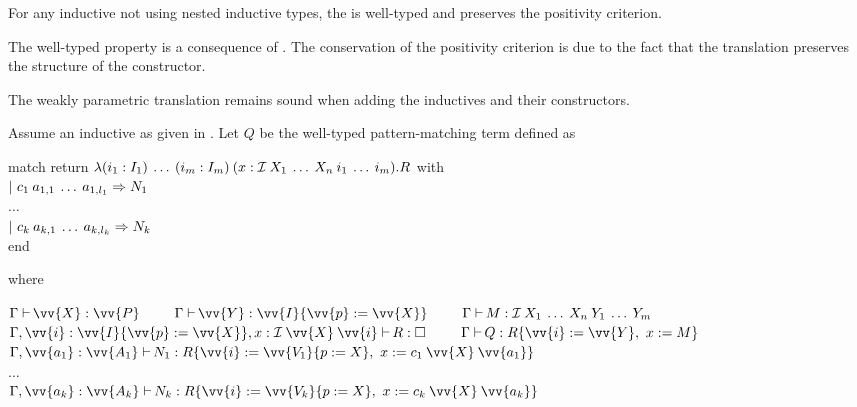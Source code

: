 \begin{Theorem}
For any inductive \IndD{} not using nested inductive types, the  is well-typed 
and preserves the positivity criterion.
\end{Theorem}

\begin{Proof}
The well-typed property is a consequence of . The conservation of the
positivity criterion is due to the fact that the translation preserves the structure of the constructor.
\end{Proof}

\begin{Corollary}
The weakly parametric translation remains sound when adding the inductives and their constructors.
\end{Corollary}

\newcommand{\MatchTerm}{\ensuremath{Q}}
\begin{Definition}
\label{def:PM}
Assume an inductive \IndD{} as given in . Let \MatchTerm{} be the well-typed 
pattern-matching term defined as
\begin{adjustwidth}{1.5em}{0cm} \normalfont \sffamily
match \M{} return $\lambda \app{(\typing{i_1}{I_1})}{\dots}{(\typing{i_m}{I_m})}{
                    (x:\app{\IndD}{X_1}{\dots}{X_n}{i_1}{\dots}{i_m})}.R$ with\\
$|\ \app{c_1}{a_{1,1}}{\dots}{a_{1,l_1}} \Rightarrow N_1$\\
$\dots$\\
$|\ \app{c_k}{a_{k,1}}{\dots}{a_{k,l_k}} \Rightarrow N_k$\\
end
\end{adjustwidth}
where
\begin{center}
{
\def\intercolumn{2.5em}
\def\interline{5pt}
$
\ctyping{\vv{X}}{\vv{P}}
\hspace{\intercolumn}
\ctyping{\vv{Y}}{\subst{\vv{I}}{\vv{p}}{\vv{X}}}
\hspace{\intercolumn}
\ctyping{M}{\app{\IndD}{X_1}{\dots}{X_n}{Y_1}{\dots}{Y_m}}
$
\vspace{\interline{}}\\
$
\ctyping[\vv{i}:\subst{\vv{I}}{\vv{p}}{\vv{X}},x:\app{\IndD}{\vv{X}}{\vv{i}}]{R}{\Type[]{}}
\hspace{\intercolumn}
\ctyping{Q}{\subst{R}{\vv{i}}{\vv{Y}}{x}{M}}
$
\vspace{\interline{}}\\
$
\ctyping[\vv{a_1}:\vv{A_1}]{N_1}{\subst{R}{
                                                    \vv{i}}{\subst{\vv{V_1}}{p}{X}}{
                                                    x}{\app{c_1}{\vv{X}}{\vv{a_1}}}}
$\\
$\dots$
\vspace{\interline{}}\\
$
\ctyping[\vv{a_k}:\vv{A_k}]{N_k}{\subst{R}{
                                                    \vv{i}}{\subst{\vv{V_k}}{p}{X}}{
                                                    x}{\app{c_k}{\vv{X}}{\vv{a_k}}}}
$
}
\end{center}
\end{Definition}

